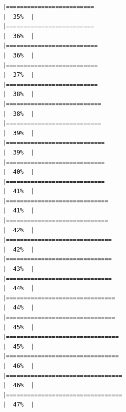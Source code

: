 \documentclass[
  ignorenonframetext,
]{beamer}
\begin{document}
\begin{frame}[fragile]{}
\begin{verbatim}
|=========================                                             |  35%  |                                                                              |=========================                                             |  36%  |                                                                              |==========================                                            |  36%  |                                                                              |==========================                                            |  37%  |                                                                              |==========================                                            |  38%  |                                                                              |===========================                                           |  38%  |                                                                              |===========================                                           |  39%  |                                                                              |============================                                          |  39%  |                                                                              |============================                                          |  40%  |                                                                              |============================                                          |  41%  |                                                                              |=============================                                         |  41%  |                                                                              |=============================                                         |  42%  |                                                                              |==============================                                        |  42%  |                                                                              |==============================                                        |  43%  |                                                                              |==============================                                        |  44%  |                                                                              |===============================                                       |  44%  |                                                                              |===============================                                       |  45%  |                                                                              |================================                                      |  45%  |                                                                              |================================                                      |  46%  |                                                                              |=================================                                     |  46%  |                                                                              |=================================                                     |  47%  |                                                      
\end{verbatim}
\end{frame}
\end{document}
